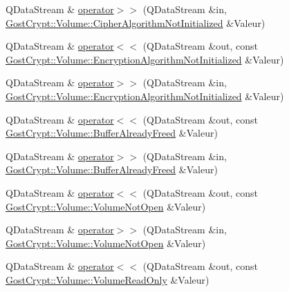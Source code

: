 \begin{DoxyCompactItemize}
\item 
Q\+Data\+Stream \& \hyperlink{namespace_gost_crypt_1_1_volume_ac440600274d548b6842e025f2490390d}{operator$>$$>$} (Q\+Data\+Stream \&in, \hyperlink{class_gost_crypt_1_1_volume_1_1_cipher_algorithm_not_initialized}{Gost\+Crypt\+::\+Volume\+::\+Cipher\+Algorithm\+Not\+Initialized} \&Valeur)
\item 
Q\+Data\+Stream \& \hyperlink{namespace_gost_crypt_1_1_volume_a840c0f9f82f25dfd80302a3ef2af2e7c}{operator$<$$<$} (Q\+Data\+Stream \&out, const \hyperlink{class_gost_crypt_1_1_volume_1_1_encryption_algorithm_not_initialized}{Gost\+Crypt\+::\+Volume\+::\+Encryption\+Algorithm\+Not\+Initialized} \&Valeur)
\item 
Q\+Data\+Stream \& \hyperlink{namespace_gost_crypt_1_1_volume_a18c3ac7cec86d05d0fc01655bf1579fc}{operator$>$$>$} (Q\+Data\+Stream \&in, \hyperlink{class_gost_crypt_1_1_volume_1_1_encryption_algorithm_not_initialized}{Gost\+Crypt\+::\+Volume\+::\+Encryption\+Algorithm\+Not\+Initialized} \&Valeur)
\item 
Q\+Data\+Stream \& \hyperlink{namespace_gost_crypt_1_1_volume_a6e4436c35dafba7a06771d7aaf129879}{operator$<$$<$} (Q\+Data\+Stream \&out, const \hyperlink{class_gost_crypt_1_1_volume_1_1_buffer_already_freed}{Gost\+Crypt\+::\+Volume\+::\+Buffer\+Already\+Freed} \&Valeur)
\item 
Q\+Data\+Stream \& \hyperlink{namespace_gost_crypt_1_1_volume_a9e496e65f2bd865254ef152f785f736f}{operator$>$$>$} (Q\+Data\+Stream \&in, \hyperlink{class_gost_crypt_1_1_volume_1_1_buffer_already_freed}{Gost\+Crypt\+::\+Volume\+::\+Buffer\+Already\+Freed} \&Valeur)
\item 
Q\+Data\+Stream \& \hyperlink{namespace_gost_crypt_1_1_volume_a7d3811802ec0a2c4a1391f7da8e828c5}{operator$<$$<$} (Q\+Data\+Stream \&out, const \hyperlink{class_gost_crypt_1_1_volume_1_1_volume_not_open}{Gost\+Crypt\+::\+Volume\+::\+Volume\+Not\+Open} \&Valeur)
\item 
Q\+Data\+Stream \& \hyperlink{namespace_gost_crypt_1_1_volume_a1311c4d609ce2a9a3e96b08bf76ac1bb}{operator$>$$>$} (Q\+Data\+Stream \&in, \hyperlink{class_gost_crypt_1_1_volume_1_1_volume_not_open}{Gost\+Crypt\+::\+Volume\+::\+Volume\+Not\+Open} \&Valeur)
\item 
Q\+Data\+Stream \& \hyperlink{namespace_gost_crypt_1_1_volume_a6df2c7796fed47c49e12cdabe563cded}{operator$<$$<$} (Q\+Data\+Stream \&out, const \hyperlink{class_gost_crypt_1_1_volume_1_1_volume_read_only}{Gost\+Crypt\+::\+Volume\+::\+Volume\+Read\+Only} \&Valeur)
\item 

\end{DoxyCompactItemize}
